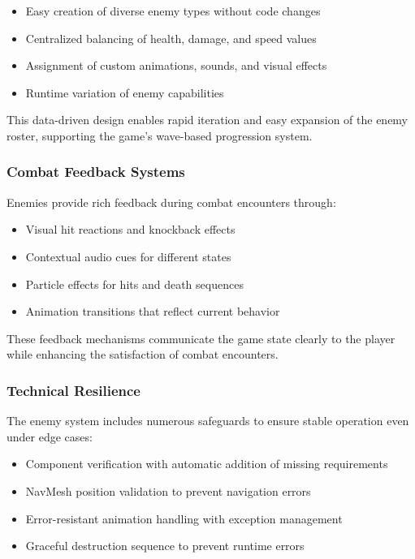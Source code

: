 \documentclass{article}
\begin{document}
    \begin{itemize}
        \item Easy creation of diverse enemy types without code changes
        \item Centralized balancing of health, damage, and speed values
        \item Assignment of custom animations, sounds, and visual effects
        \item Runtime variation of enemy capabilities
    \end{itemize}

    This data-driven design enables rapid iteration and easy expansion of the enemy roster, supporting the game's wave-based progression system.

    \subsubsection{Combat Feedback Systems}
    Enemies provide rich feedback during combat encounters through:

    \begin{itemize}
        \item Visual hit reactions and knockback effects
        \item Contextual audio cues for different states
        \item Particle effects for hits and death sequences
        \item Animation transitions that reflect current behavior
    \end{itemize}

    These feedback mechanisms communicate the game state clearly to the player while enhancing the satisfaction of combat encounters.

    \subsubsection{Technical Resilience}
    The enemy system includes numerous safeguards to ensure stable operation even under edge cases:

    \begin{itemize}
        \item Component verification with automatic addition of missing requirements
        \item NavMesh position validation to prevent navigation errors
        \item Error-resistant animation handling with exception management
        \item Graceful destruction sequence to prevent runtime errors
    \end{itemize}
\end{document}
